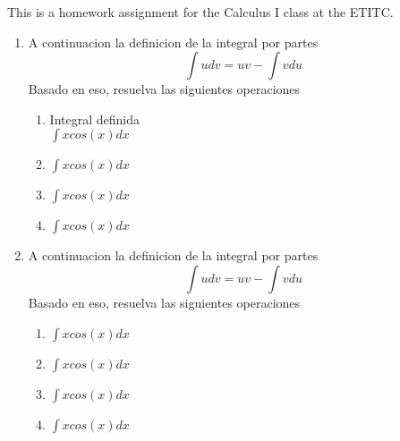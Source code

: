 \documentclass[12pt]{article}%
\begin{document}
%
\normalsize%
\pagestyle{header}%
This is a homework assignment for the Calculus I class at the ETITC.%
\begin{enumerate}[wide, labelwidth=!, labelindent=0pt,label={Question \arabic*. }]%
\item%
%
A continuacion la definicion de la integral por partes%
\[\int udv=uv-\int vdu\]%
Basado en eso, resuelva las siguientes operaciones%
\begin{enumerate}[wide, labelwidth=!, labelindent=0pt,label={\Alph*) }]%
\item%
%
Integral definida\\%
\(\int xcos(x)dx\)%
\item%
%
\(\int xcos(x)dx\)%
\item%
%
\(\int xcos(x)dx\)%
\item%
%
\(\int xcos(x)dx\)%
\end{enumerate}%
\item%
%
A continuacion la definicion de la integral por partes%
\[\int udv=uv-\int vdu\]%
Basado en eso, resuelva las siguientes operaciones%
\begin{enumerate}[wide, labelwidth=!, labelindent=0pt,label={\Alph*) }]%
\item%
%
\(\int xcos(x)dx\)%
\item%
%
\(\int xcos(x)dx\)%
\item%
%
\(\int xcos(x)dx\)%
\item%
%
\(\int xcos(x)dx\)%
\end{enumerate}%
\end{enumerate}%
\end{document}
